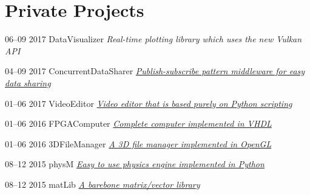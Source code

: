 \documentclass[]{cv-style}          %
\begin{document}
\section{Private Projects}
\begin{entrylist}
  \entry
    {06–09 2017}
    {DataVisualizer}
    {}
    {\emph{{Real-time plotting library which uses the new Vulkan API}}}
    
            \entry
    {04–09 2017}
    {ConcurrentDataSharer}
    {}
    {\emph{\href{https://github.com/marso329/ConcurrentDataSharer}{Publish-subscribe pattern middleware for easy data sharing}}}
    
               \entry
    {01–06 2017}
    {VideoEditor}
    {}
    {\emph{\href{https://github.com/marso329/VideoEditor}{Video editor that is based purely on Python scripting}}}
    
  \entry
    {01–06 2016}
    {FPGAComputer}
    {}
    {\emph{\href{https://github.com/marso329/FPGAComputer}{Complete computer implemented in VHDL}}}
    
      \entry
    {01–06 2016}
    {3DFileManager}
    {}
    {\emph{\href{https://github.com/marso329/3DFileManager}{A 3D file manager implemented in OpenGL}}}
   
    
               \entry
    {08–12 2015}
    {physM}
    {}
    {\emph{\href{https://github.com/marso329/physM}{Easy to use physics engine implemented in Python}}}
    
                   \entry
    {08–12 2015}
    {matLib}
    {}
    {\emph{\href{https://github.com/marso329/matLib}{A barebone matrix/vector library }}}
\end{entrylist}
\end{document}
